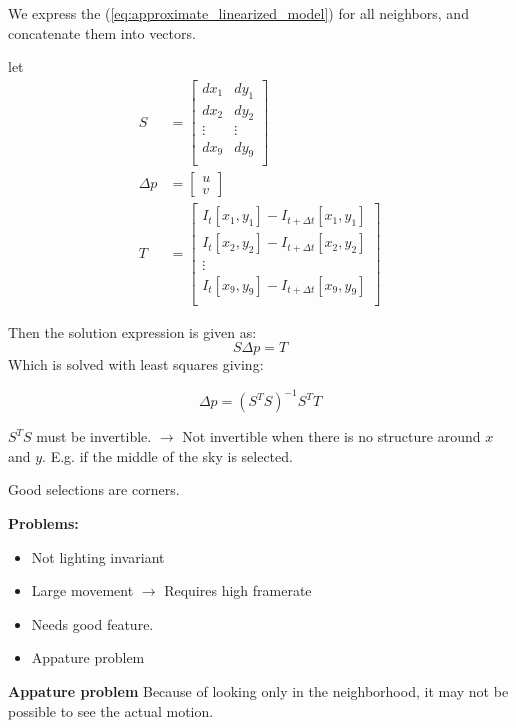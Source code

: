 \documentclass[a4paper]{article}
\begin{document}
We express the (\ref{eq:approximate_linearized_model})  for all neighbors, and concatenate them into vectors. 

let 
\begin{align}
S &= \begin{bmatrix}
dx_1 &dy_1  \\
dx_2 &dy_2 \\ 
\vdots & \vdots \\
dx_9 &dy_9 \\ 
\end{bmatrix}\\
	\Delta p &= \begin{bmatrix}
u \\
v
\end{bmatrix}\\
T &= \begin{bmatrix}
	I_t[x_1,y_1] - I_{t+\Delta t}[x_1,y_1] \\
	I_t[x_2,y_2] - I_{t+\Delta t}[x_2,y_2] \\
	\vdots \\
	I_t[x_9,y_9] - I_{t+\Delta t}[x_9,y_9] \\
\end{bmatrix} 
\end{align}

Then the solution expression is given as:
\begin{equation}
	S \Delta p = T
\end{equation}
Which is solved with least squares giving:

\begin{equation}
	\Delta p = (S^{T} S)^{-1} S^{T} T
\end{equation}

$ S^{T} S $ must be invertible.  $ \rightarrow $ Not invertible when there is no structure around $ x $ and  $ y $. E.g. if the middle of the sky is selected.

Good  selections are corners.

\vspace{5pt}

\textbf{Problems:} 
\begin{itemize}
	\item Not lighting invariant
	\item Large movement $ \rightarrow $ Requires high framerate 
	\item Needs good feature.
	\item Appature problem
\end{itemize}
\textbf{Appature problem} 
Because of looking only in the neighborhood, it may not be possible to see the actual motion.
\end{document}

